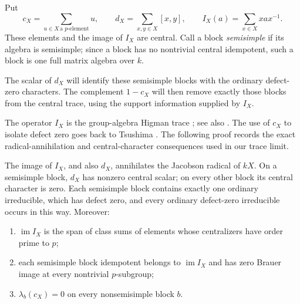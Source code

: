 Put
\[
 c_X=\sum_{u\in X\,\text{a }p\text{-element}}u,
 \qquad d_X=\sum_{x,y\in X}[x,y],
 \qquad I_X(a)=\sum_{x\in X}xax^{-1}.
\]
These elements and the image of $I_X$ are central. Call a block
\emph{semisimple} if its algebra is semisimple; since a block has no
nontrivial central idempotent, such a block is one full matrix
algebra over $k$.

The scalar of $d_X$ will identify these semisimple blocks with the
ordinary defect-zero characters. The complement $1-c_X$ will then remove
exactly those blocks from the central trace, using the support
information supplied by $I_X$.

The operator $I_X$ is the group-algebra Higman trace
\cite[Section~2]{Higman1955}; see also
\cite[Sections~2.4--2.5]{LorenzTokoly2011}. The use of $c_X$ to
isolate defect zero goes back to Tsushima \cite[Theorem~1]{Tsushima1971}.
The following proof records the exact radical-annihilation and
central-character consequences used in our trace limit.

\begin{lemma}\label{lem:defect-zero-detection}
The image of $I_X$, and also $d_X$, annihilates the Jacobson radical
of $kX$. On a semisimple block, $d_X$ has nonzero central scalar;
on every other block its central character is zero. Each semisimple
block contains exactly one ordinary irreducible, which has defect
zero, and every ordinary defect-zero irreducible occurs in this
way. Moreover:
\begin{enumerate}[label=\textup{(\roman*)}]
 \item $\operatorname{im}I_X$ is the span of class sums of elements
 whose centralizers have order prime to $p$;
 \item each semisimple block idempotent belongs to
 $\operatorname{im}I_X$ and has zero Brauer image at every nontrivial
 $p$-subgroup;
 \item $\lambda_b(c_X)=0$ on every nonsemisimple block $b$.
\end{enumerate}
\end{lemma}

